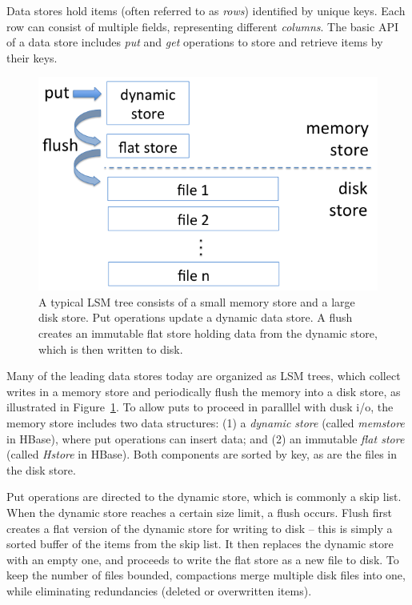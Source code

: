 Data stores hold items (often referred to as \emph{rows})
identified by unique keys. Each row can consist of multiple fields, representing different \emph{columns}.
The basic API of a data store includes \emph{put} and \emph{get} operations to store and retrieve items by their keys.

\begin{figure}[tbh]
\center
\includegraphics[width=0.85\columnwidth]{LSM} 
\caption{A typical LSM tree consists of a small memory store and a large disk store. 
Put operations update a dynamic data store. A flush creates an immutable flat store  holding 
data from the dynamic store, which is then written to disk.}
\label{fig:LSM}
\end{figure}

Many of the leading data stores today are organized as LSM trees, which collect writes in a memory store 
and periodically flush the memory into a disk store, as illustrated in Figure~\ref{fig:LSM}. 
To allow puts to proceed in paralllel with dusk i/o, the memory store includes two data structures:
(1) a \emph{dynamic store} (called \emph{memstore} in HBase), where put operations can insert data; and  
(2) an immutable \emph{flat store} (called \emph{Hstore} in HBase).
Both components are sorted by key, as are the files in the disk store. 

Put operations are directed to the dynamic store, which is commonly a skip list.
When the dynamic store reaches a certain size limit, a flush occurs. 
Flush first creates a flat version of the dynamic store for writing to disk -- this is simply a sorted buffer of the items from the skip list.  
It then replaces the dynamic store with an empty one, and proceeds to write the flat store as a new file to disk.
 To keep the number of files bounded, compactions merge multiple disk files into one, while eliminating redundancies 
 (deleted or overwritten items). 

